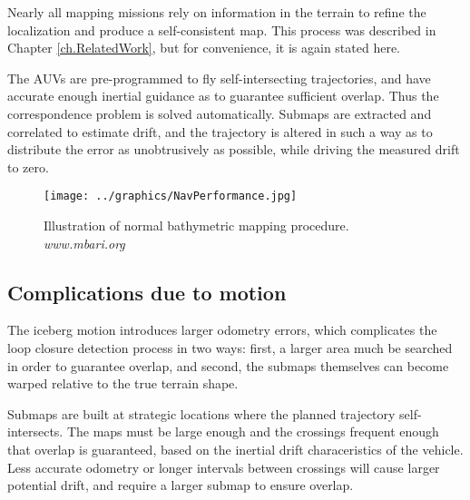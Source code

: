 Nearly all mapping missions rely on information in the terrain to refine the localization and produce a self-consistent map. This process was described in Chapter \ref{ch.RelatedWork}, but for convenience, it is again stated here.

The AUVs are pre-programmed to fly self-intersecting trajectories, and have accurate enough inertial guidance as to guarantee sufficient overlap. Thus the correspondence problem is solved automatically. Submaps are extracted and correlated to estimate drift, and the trajectory is altered in such a way as to distribute the error as unobtrusively as possible, while driving the measured drift to zero.

 \begin{figure}[htbp]
   \centering
   \texttt{[image: ../graphics/NavPerformance.jpg]} %
   \caption{Illustration of normal bathymetric mapping procedure. \emph{www.mbari.org} }
   \label{fig:BathyMapping2}
\end{figure}



\subsection{Complications due to motion}

The iceberg motion introduces larger odometry errors, which complicates the loop closure detection process in two ways: first, a larger area much be searched in order to guarantee overlap, and second, the submaps themselves can become warped relative to the true terrain shape.


Submaps are built at strategic locations where the planned trajectory self-intersects. The maps must be large enough and the crossings frequent enough that overlap is guaranteed, based on the inertial drift characeristics of the vehicle. Less accurate odometry or longer intervals between crossings will cause larger potential drift, and require a larger submap to ensure overlap. 

